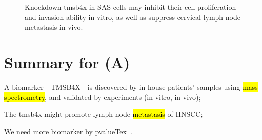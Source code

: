 \documentclass[
paper=landscape,
paper=160mm:90mm, %
fontsize=11pt, %
pagesize, %
parskip=half-, %
]{scrartcl} %
\theoremstyle{mythmstyle} %
\begin{document}
{\begin{figure}
\captionsetup{labelformat=empty}
\caption{
Knockdown \acrshort{tmsb4x} in SAS cells may inhibit their cell proliferation and invasion ability in vitro, as well as suppress cervical lymph node metastasis in vivo.
}

\end{figure}%


\clearpage



\section{Summary for (A)}

\begin{outline}


\1 A biomarker---TMSB4X---is discovered by in-house patients' samples using \hl{mass spectrometry}, and validated by experiments (in vitro, in vivo);

\1 The \acrlong{tmsb4x} might promote lymph node \hl{metastasis} of HNSCC;

\1 We need more biomarker by pvalueTex~\autocite{Chi2021}.










\end{outline}



} %
\end{document}
